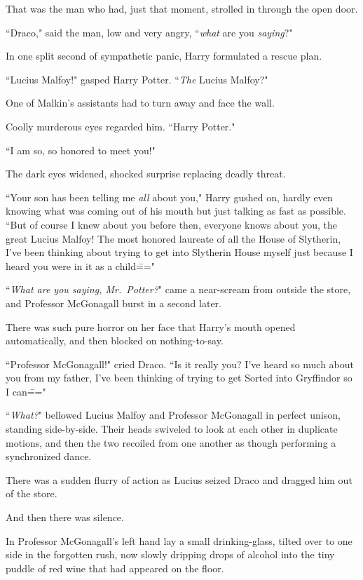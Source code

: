 That was the man who had, just that moment, strolled in through the open door.

``Draco," said the man, low and very angry, ``\emph{what} are you \emph{saying}?"

In one split second of sympathetic panic, Harry formulated a rescue plan.

``Lucius Malfoy!" gasped Harry Potter. ``\emph{The} Lucius Malfoy?"

One of Malkin's assistants had to turn away and face the wall.

Coolly murderous eyes regarded him. ``Harry Potter."

``I am so, so honored to meet you!"

The dark eyes widened, shocked surprise replacing deadly threat.

``Your son has been telling me \emph{all} about you," Harry gushed on, hardly even knowing what was coming out of his mouth but just talking as fast as possible. ``But of course I knew about you before then, everyone knows about you, the great Lucius Malfoy! The most honored laureate of all the House of Slytherin, I've been thinking about trying to get into Slytherin House myself just because I heard you were in it as a child\==="

``\emph{What are you saying, Mr.~Potter?}" came a near-scream from outside the store, and Professor McGonagall burst in a second later.

There was such pure horror on her face that Harry's mouth opened automatically, and then blocked on nothing-to-say.

``Professor McGonagall!" cried Draco. ``Is it really you? I've heard so much about you from my father, I've been thinking of trying to get Sorted into Gryffindor so I can\==="

``\emph{What?}" bellowed Lucius Malfoy and Professor McGonagall in perfect unison, standing side-by-side. Their heads swiveled to look at each other in duplicate motions, and then the two recoiled from one another as though performing a synchronized dance.

There was a sudden flurry of action as Lucius seized Draco and dragged him out of the store.

And then there was silence.

In Professor McGonagall's left hand lay a small drinking-glass, tilted over to one side in the forgotten rush, now slowly dripping drops of alcohol into the tiny puddle of red wine that had appeared on the floor.


